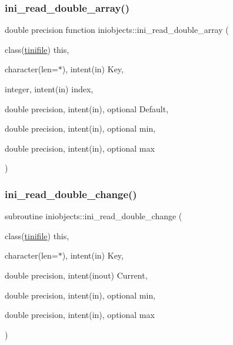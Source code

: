 \subsubsection{\texorpdfstring{ini\+\_\+read\+\_\+double\+\_\+array()}{ini\_read\_double\_array()}}
{\footnotesize\ttfamily double precision function iniobjects\+::ini\+\_\+read\+\_\+double\+\_\+array (\begin{DoxyParamCaption}\item[{class(\mbox{\hyperlink{structiniobjects_1_1tinifile}{tinifile}})}]{this,  }\item[{character(len=$\ast$), intent(in)}]{Key,  }\item[{integer, intent(in)}]{index,  }\item[{double precision, intent(in), optional}]{Default,  }\item[{double precision, intent(in), optional}]{min,  }\item[{double precision, intent(in), optional}]{max }\end{DoxyParamCaption})\hspace{0.3cm}{\ttfamily [private]}}

\mbox{\label{namespaceiniobjects_a5e063b545af508f22c652618784a4106}} 
\subsubsection{\texorpdfstring{ini\+\_\+read\+\_\+double\+\_\+change()}{ini\_read\_double\_change()}}
{\footnotesize\ttfamily subroutine iniobjects\+::ini\+\_\+read\+\_\+double\+\_\+change (\begin{DoxyParamCaption}\item[{class(\mbox{\hyperlink{structiniobjects_1_1tinifile}{tinifile}})}]{this,  }\item[{character(len=$\ast$), intent(in)}]{Key,  }\item[{double precision, intent(inout)}]{Current,  }\item[{double precision, intent(in), optional}]{min,  }\item[{double precision, intent(in), optional}]{max }\end{DoxyParamCaption})\hspace{0.3cm}{\ttfamily [private]}}



